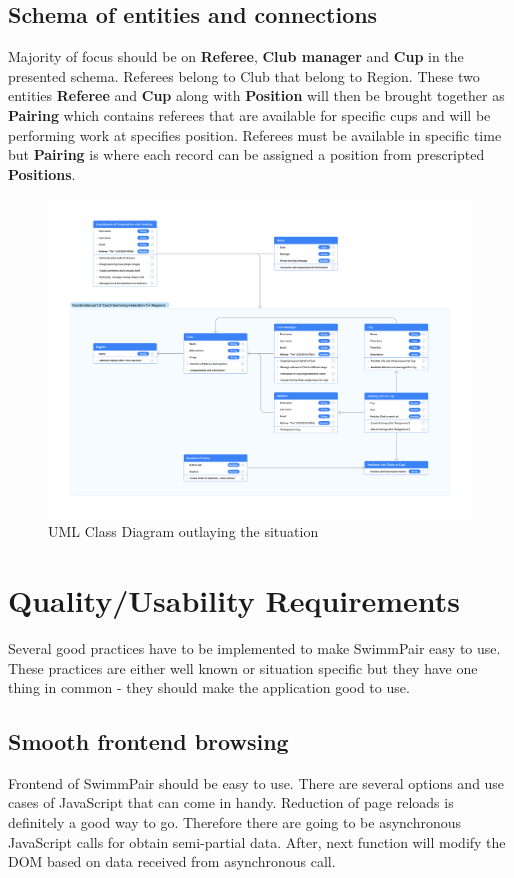 \subsection*{Schema of entities and connections}
Majority of focus should be on \textbf{Referee}, \textbf{Club manager} and \textbf{Cup} in the presented schema. Referees belong to Club that belong to Region. These two entities \textbf{Referee} and \textbf{Cup} along with \textbf{Position} will then be brought together as \textbf{Pairing} which contains referees that are available for specific cups and will be performing work at specifies position. Referees must be available in specific time but \textbf{Pairing} is where each record can be assigned a position from prescripted \textbf{Positions}.
\begin{figure}[h]
\includegraphics[scale=0.160]{img/swimmpair_uml.png}
  \caption{UML Class Diagram outlaying the situation}
  \label{fig1.2:uml}
\end{figure}
\newpage
\section{Quality/Usability Requirements}
Several good practices have to be implemented to make SwimmPair easy to use. These practices are either well known or situation specific but they have one thing in common - they should make the application good to use.
\subsection*{Smooth frontend browsing}
\par
Frontend of SwimmPair should be easy to use. There are several options and use cases of JavaScript that can come in handy. Reduction of page reloads is definitely a good way to go. Therefore there are going to be asynchronous JavaScript calls for obtain semi-partial data. After, next function will modify the DOM based on data received from asynchronous call. 
